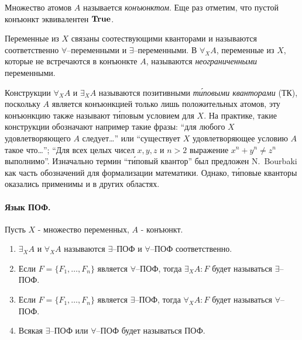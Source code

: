 \documentclass[a4paper]{jctart15b}
\begin{document}
Множество атомов $A$ называется {\em конъюнктом}. Еще раз отметим, что пустой конъюнкт эквивалентен $\text{\textbf{True}}$.

Переменные из $X$ связаны соотествующими кванторами и называются соответственно $\forall$--переменными и $\exists$--переменными. В $\forall_XA$, переменные из $X$, которые не встречаются в конъюнкте $A$, называются {\em неограниченными} переменными.


Конструкции $\forall_XA$ и $\exists_XA$ называются позитивными \emph{т\'иповыми кванторами} (ТК), поскольку $A$ является конъюнкцией только лишь положительных атомов, эту конъюнкцию также называют т\'иповым условием для $X$. На практике, такие конструкции обозначают например такие фразы: ``для любого $X$ удовлетворяющего $A$ следует\ldots{}'' или ``существует $X$ удовлетворяющее условию $A$ такое что\ldots{}''; ``Для всех целых чисел $x,y,z$ и $n>2$ выражение $x^n + y^n \ne z^n$ выполнимо''. Изначально термин ``т\'иповый квантор'' был предложен N.~Bourbaki \cite{Bourbaki} как часть обозначений для формализации математики. Однако, т\'иповые кванторы оказались применимы и в других областях.

\paragraph{Язык ПОФ.}

\begin{definition}
\label{def:pcf}
Пусть $X$ - множество переменных, $A$ - конъюнкт.
\begin{enumerate}

\item $\exists_XA$ и $\forall_XA$ называются $\exists$--ПОФ и $\forall$--ПОФ соответственно.

\item Если $F = \{F_1,\ldots,F_n\}$ является $\forall$--ПОФ, тогда $\exists_XA\colon F$ будет называться $\exists$--ПОФ.

\item Если $F = \{F_1,\ldots,F_n\}$ является $\exists$--ПОФ, тогда $\forall_XA\colon F$ будет называться $\forall$--ПОФ.

\item Всякая $\exists$--ПОФ или $\forall$--ПОФ будет называться ПОФ.
\end{enumerate}
\end{definition}
\end{document}
